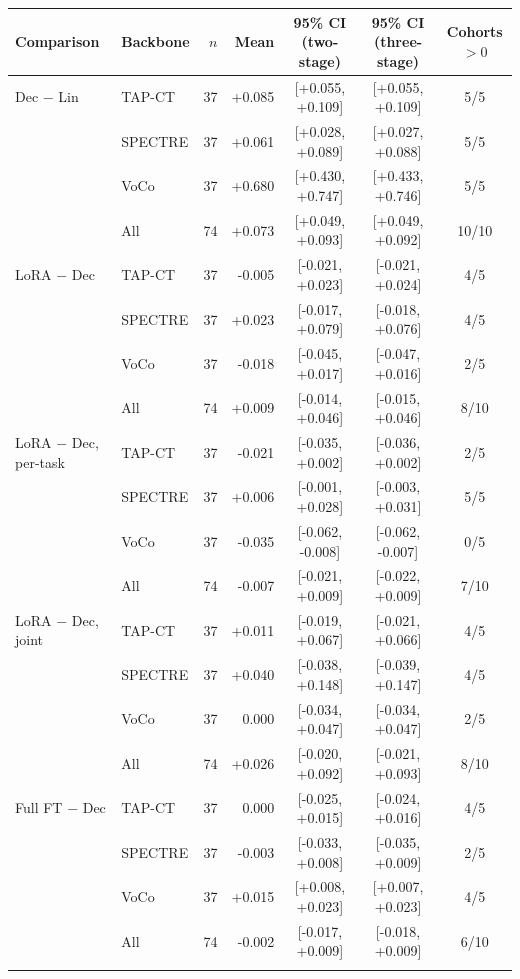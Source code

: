 \begin{tabular}{@{}llrrccc@{}}
\toprule
Comparison & Backbone & $n$ & Mean & 95\% CI (two-stage) & 95\% CI (three-stage) & Cohorts $>0$ \\
\midrule
Dec $-$ Lin & TAP-CT & 37 & +0.085 & [+0.055, +0.109] & [+0.055, +0.109] & 5/5 \\
 & SPECTRE & 37 & +0.061 & [+0.028, +0.089] & [+0.027, +0.088] & 5/5 \\
 & VoCo & 37 & +0.680 & [+0.430, +0.747] & [+0.433, +0.746] & 5/5 \\
 & All & 74 & +0.073 & [+0.049, +0.093] & [+0.049, +0.092] & 10/10 \\
\addlinespace[2pt]
LoRA $-$ Dec & TAP-CT & 37 & -0.005 & [-0.021, +0.023] & [-0.021, +0.024] & 4/5 \\
 & SPECTRE & 37 & +0.023 & [-0.017, +0.079] & [-0.018, +0.076] & 4/5 \\
 & VoCo & 37 & -0.018 & [-0.045, +0.017] & [-0.047, +0.016] & 2/5 \\
 & All & 74 & +0.009 & [-0.014, +0.046] & [-0.015, +0.046] & 8/10 \\
\addlinespace[2pt]
LoRA $-$ Dec, per-task & TAP-CT & 37 & -0.021 & [-0.035, +0.002] & [-0.036, +0.002] & 2/5 \\
 & SPECTRE & 37 & +0.006 & [-0.001, +0.028] & [-0.003, +0.031] & 5/5 \\
 & VoCo & 37 & -0.035 & [-0.062, -0.008] & [-0.062, -0.007] & 0/5 \\
 & All & 74 & -0.007 & [-0.021, +0.009] & [-0.022, +0.009] & 7/10 \\
\addlinespace[2pt]
LoRA $-$ Dec, joint & TAP-CT & 37 & +0.011 & [-0.019, +0.067] & [-0.021, +0.066] & 4/5 \\
 & SPECTRE & 37 & +0.040 & [-0.038, +0.148] & [-0.039, +0.147] & 4/5 \\
 & VoCo & 37 & 0.000 & [-0.034, +0.047] & [-0.034, +0.047] & 2/5 \\
 & All & 74 & +0.026 & [-0.020, +0.092] & [-0.021, +0.093] & 8/10 \\
\addlinespace[2pt]
Full FT $-$ Dec & TAP-CT & 37 & 0.000 & [-0.025, +0.015] & [-0.024, +0.016] & 4/5 \\
 & SPECTRE & 37 & -0.003 & [-0.033, +0.008] & [-0.035, +0.009] & 2/5 \\
 & VoCo & 37 & +0.015 & [+0.008, +0.023] & [+0.007, +0.023] & 4/5 \\
 & All & 74 & -0.002 & [-0.017, +0.009] & [-0.018, +0.009] & 6/10 \\
\addlinespace[2pt]

\end{tabular}
